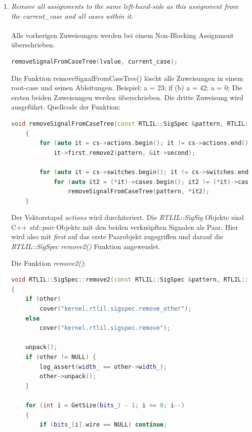 \documentclass[11pt]{report}
\begin{document}
\begin{enumerate}
  \item \textit{Remove all assignments to the same left-hand-side as this assignment from the current\_case and all
cases within it.}
\\
\\
Alle vorherigen Zuweisungen werden bei einem Non-Blocking Assignment überschrieben.
\begin{lstlisting}[language=C++]
removeSignalFromCaseTree(lvalue, current_case);
\end{lstlisting}
Die Funktion removeSignalFromCaseTree() löscht alle Zuweisungen in einem root-case und seinen Ableitungen. Beispiel: a = 23; if (b) a = 42; a = 0; Die ersten beiden Zuweisungen werden überschrieben. Die dritte Zuweisung wird ausgeführt.
Quellcode der Funktion:
\begin{lstlisting}[language=C++]
void removeSignalFromCaseTree(const RTLIL::SigSpec &pattern, RTLIL::CaseRule *cs)
	{
		for (auto it = cs->actions.begin(); it != cs->actions.end(); it++)
			it->first.remove2(pattern, &it->second);

		for (auto it = cs->switches.begin(); it != cs->switches.end(); it++)
			for (auto it2 = (*it)->cases.begin(); it2 != (*it)->cases.end(); it2++)
				removeSignalFromCaseTree(pattern, *it2);
	}

\end{lstlisting}
Der Vektorstapel \textit{actions} wird durchiteriert. 
Die \textit{RTLIL::SigSig} Objekte sind C++ \textit{std::pair} Objekte mit den beiden verknüpften Signalen als Paar.
Hier wird also mit \textit{first} auf das erste Paarobjekt zugegriffen und darauf die \textit{RTLIL::SigSpec remove2()} Funktion angewendet.

Die Funktion \textit{remove2()}:
\begin{lstlisting}[language=C++]
void RTLIL::SigSpec::remove2(const RTLIL::SigSpec &pattern, RTLIL::SigSpec *other)
{
	if (other)
		cover("kernel.rtlil.sigspec.remove_other");
	else
		cover("kernel.rtlil.sigspec.remove");

	unpack();
	if (other != NULL) {
		log_assert(width_ == other->width_);
		other->unpack();
	}

	for (int i = GetSize(bits_) - 1; i >= 0; i--)
	{
		if (bits_[i].wire == NULL) continue;


\end{lstlisting}
\end{enumerate}
\end{document}
